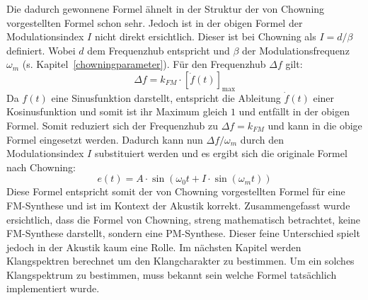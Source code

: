 Die dadurch gewonnene Formel ähnelt in der Struktur der von Chowning vorgestellten Formel schon sehr. Jedoch ist in der obigen Formel der Modulationsindex $I$ nicht direkt ersichtlich. Dieser ist bei Chowning als $I=d/\beta$ definiert. Wobei $d$ dem Frequenzhub entspricht und $\beta$ der Modulationsfrequenz $\omega_m$ (s. Kapitel~\ref{chowningparameter}). Für den Frequenzhub $\Delta f$ gilt: \cite[S. 219]{lathi}
\begin{equation*}
\Delta f = k_{FM}\cdot [\dot f(t)]_{\max}
\end{equation*}
Da $f(t)$ eine Sinusfunktion darstellt, entspricht die Ableitung $\dot f(t)$ einer Kosinusfunktion und somit ist ihr Maximum gleich $1$ und entfällt in der obigen Formel. Somit reduziert sich der Frequenzhub zu $\Delta f=k_{FM}$ und kann in die obige Formel eingesetzt werden. Dadurch kann nun $\Delta f / \omega_m$ durch den Modulationsindex $I$ substituiert werden und es ergibt sich die originale Formel nach Chowning:
\begin{equation}
e(t)=A\cdot\sin(\omega_0t+I\cdot\sin(\omega_m t))
\label{eq:FM_Chowning}
\end{equation}
Diese Formel entspricht somit der von Chowning vorgestellten Formel für eine FM-Synthese und ist im Kontext der Akustik korrekt. Zusammengefasst wurde ersichtlich, dass die Formel von Chowning, streng mathematisch betrachtet, keine FM-Synthese darstellt, sondern eine \glqq PM-Synthese\grqq. Dieser feine Unterschied spielt jedoch in der Akustik kaum eine Rolle.
Im nächsten Kapitel werden Klangspektren berechnet um den Klangcharakter zu bestimmen. Um ein solches Klangspektrum zu bestimmen, muss bekannt sein welche Formel tatsächlich implementiert wurde.

\FloatBarrier
